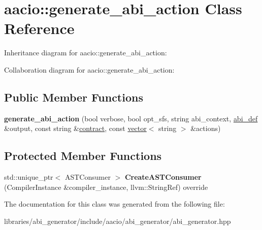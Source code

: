 \hypertarget{classaacio_1_1generate__abi__action}{}\section{aacio\+:\+:generate\+\_\+abi\+\_\+action Class Reference}
\label{classaacio_1_1generate__abi__action}


Inheritance diagram for aacio\+:\+:generate\+\_\+abi\+\_\+action\+:


Collaboration diagram for aacio\+:\+:generate\+\_\+abi\+\_\+action\+:
\subsection*{Public Member Functions}
\begin{DoxyCompactItemize}
\item 
\mbox{\label{classaacio_1_1generate__abi__action_a102aa405d5be9cf8f965663a90f3f4d8}} 
{\bfseries generate\+\_\+abi\+\_\+action} (bool verbose, bool opt\+\_\+sfs, string abi\+\_\+context, \mbox{\hyperlink{structaacio_1_1chain_1_1contracts_1_1abi__def}{abi\+\_\+def}} \&output, const string \&\mbox{\hyperlink{structaacio_1_1contract}{contract}}, const \mbox{\hyperlink{classstd_1_1vector}{vector}}$<$ string $>$ \&actions)
\end{DoxyCompactItemize}
\subsection*{Protected Member Functions}
\begin{DoxyCompactItemize}
\item 
\mbox{\label{classaacio_1_1generate__abi__action_a9c45c4c8046512a31299db9cbed28d89}} 
std\+::unique\+\_\+ptr$<$ A\+S\+T\+Consumer $>$ {\bfseries Create\+A\+S\+T\+Consumer} (Compiler\+Instance \&compiler\+\_\+instance, llvm\+::\+String\+Ref) override
\end{DoxyCompactItemize}


The documentation for this class was generated from the following file\+:\begin{DoxyCompactItemize}
\item 
libraries/abi\+\_\+generator/include/aacio/abi\+\_\+generator/abi\+\_\+generator.\+hpp\end{DoxyCompactItemize}
